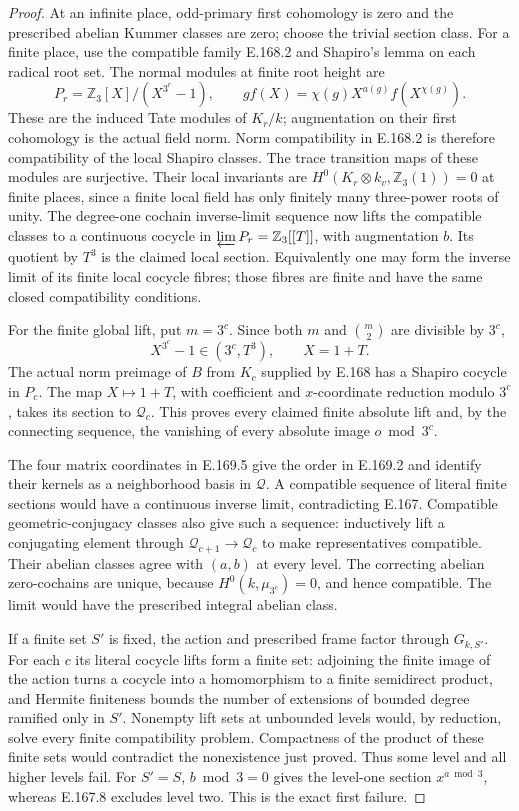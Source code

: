 \begin{proof}
At an infinite place, odd-primary first cohomology is zero and the
prescribed abelian Kummer classes are zero; choose the trivial
section class.  For a finite place, use the compatible family
E.168.2 and Shapiro's lemma on each radical root set.  The normal modules at finite
root height are
\[
 P_r=\mathbb Z_3[X]/(X^{3^r}-1),\qquad
 g f(X)=\chi(g)X^{a(g)}f(X^{\chi(g)}).
\tag{E.169.6}
\]
These are the induced Tate modules of \(K_r/k\); augmentation
on their first cohomology is the actual field norm.  Norm
compatibility in E.168.2 is therefore compatibility of the
local Shapiro classes.  The trace transition maps of these
modules are surjective.  Their local invariants are
\(H^0(K_r\otimes k_v,\mathbb Z_3(1))=0\) at finite places, since
a finite local field has only finitely many three-power roots
of unity.
The degree-one cochain inverse-limit sequence now lifts the
compatible classes to a continuous cocycle in
\(\varprojlim P_r=\mathbb Z_3[[T]]\), with augmentation \(b\).
Its quotient by \(T^3\) is the claimed local section.
Equivalently one may form the inverse limit of its finite local
cocycle fibres; those fibres are finite and have the same closed
compatibility conditions.

For the finite global lift, put \(m=3^c\).  Since both
\(m\) and \(\binom m2\) are divisible by \(3^c\),
\[
                   X^{3^c}-1\in(3^c,T^3),\qquad X=1+T.
\tag{E.169.7}
\]
The actual norm preimage of \(B\) from \(K_c\) supplied by
E.168 has a Shapiro cocycle in \(P_c\).  The map
\(X\mapsto1+T\), with coefficient and \(x\)-coordinate
reduction modulo \(3^c\), takes its section to
\(\mathcal Q_c\).  This proves every claimed finite absolute
lift and, by the connecting sequence, the vanishing of every
absolute image \(o\bmod3^c\).

The four matrix coordinates in E.169.5 give the order in
E.169.2 and identify their kernels as a neighborhood basis in
\(\mathcal Q\).  A compatible sequence of literal finite
sections would have a continuous inverse limit, contradicting
E.167.  Compatible geometric-conjugacy classes also give such
a sequence: inductively lift a conjugating element through
\(\mathcal Q_{c+1}\to\mathcal Q_c\) to make representatives
compatible.  Their abelian classes agree with \((a,b)\) at
every level.  The correcting abelian zero-cochains are unique,
because \(H^0(k,\mu_{3^c})=0\), and hence compatible.
The limit would have the prescribed integral abelian class.

If a finite set \(S'\) is fixed, the action and prescribed
frame factor through \(G_{k,S'}\).  For each \(c\) its literal
cocycle lifts form a finite set: adjoining the finite image
of the action turns a cocycle into a homomorphism to a finite
semidirect product, and Hermite finiteness bounds the number
of extensions of bounded degree ramified only in \(S'\).
Nonempty lift sets at unbounded levels would, by reduction,
solve every finite compatibility problem.  Compactness of
the product of these finite sets would contradict the
nonexistence just proved.  Thus some level and all higher
levels fail.  For \(S'=S\), \(b\bmod3=0\) gives the
level-one section \(x^{a\bmod3}\), whereas E.167.8 excludes
level two.  This is the exact first failure.


\end{proof}
